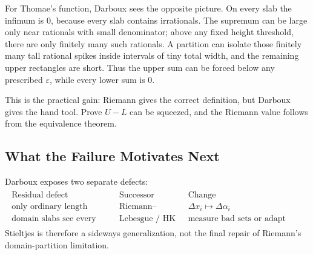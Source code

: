 

\begin{remark*}[Interpretation]
For Thomae's function, Darboux sees the opposite picture. On every slab the
infimum is \(0\), because every slab contains irrationals. The supremum can be
large only near rationals with small denominator; above any fixed height
threshold, there are only finitely many such rationals. A partition can isolate
those finitely many tall rational spikes inside intervals of tiny total width,
and the remaining upper rectangles are short. Thus the upper sum can be forced
below any prescribed \(\varepsilon\), while every lower sum is \(0\).

This is the practical gain: Riemann gives the correct definition, but Darboux
gives the hand tool. Prove \(U-L\) can be squeezed, and the Riemann value
follows from the equivalence theorem.
\end{remark*}

\subsection*{What the Failure Motivates Next}

\begin{remark*}[Interpretation]
Darboux exposes two separate defects:
\[
\begin{aligned}
\begin{array}{c|c|c}
\text{Residual defect} & \text{Successor} & \text{Change}\\
\hline
\text{only ordinary length} & \text{Riemann--Stieltjes} &
\Delta x_i\mapsto \Delta\alpha_i\\
\text{domain slabs see every bad set} & \text{Lebesgue / HK} &
\text{measure bad sets or adapt fineness}
\end{array}
\end{aligned}
\]
Stieltjes is therefore a sideways generalization, not the final repair of
Riemann's domain-partition limitation.
\end{remark*}
